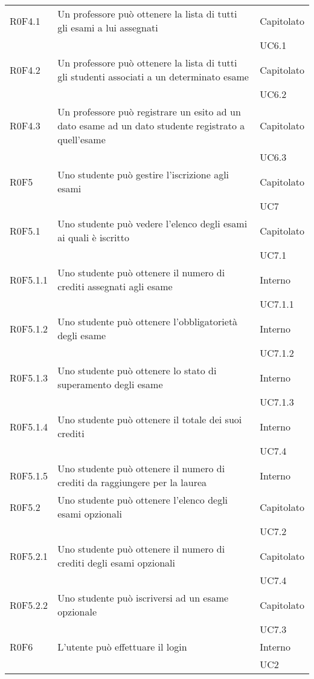 \documentclass[AnalisiDeiRequisiti.tex]{subfiles}
\begin{document}
\begin{longtable}[H]{|p{2cm}|p{5cm}|p{5cm}|}
	R0F4.1 &  Un professore può ottenere la lista di tutti gli esami a lui assegnati & Capitolato \\ 
	& & UC6.1 \\ \hline
	R0F4.2 &  Un professore può ottenere la lista di tutti gli studenti associati a un determinato esame & Capitolato  \\ 
	& & UC6.2 \\ \hline
	R0F4.3 &  Un professore può registrare un esito ad un dato esame ad un dato studente registrato a quell'esame & Capitolato \\ 
	& & UC6.3 \\ \hline
	R0F5 &  Uno studente può gestire l'iscrizione agli esami & Capitolato \\ 
	& & UC7 \\ \hline
	R0F5.1 &  Uno studente può vedere l'elenco degli esami ai quali è iscritto & Capitolato \\ 
	& & UC7.1 \\ \hline
	R0F5.1.1 &  Uno studente può ottenere il numero di crediti assegnati agli esame & Interno \\ 
	& & UC7.1.1 \\ \hline
	R0F5.1.2 &  Uno studente può ottenere l'obbligatorietà degli esame & Interno \\ 
	& & UC7.1.2 \\ \hline
	R0F5.1.3 &  Uno studente può ottenere lo stato di superamento degli esame & Interno \\ 
	& & UC7.1.3 \\ \hline
	R0F5.1.4 &  Uno studente può ottenere il totale dei suoi crediti & Interno \\ 
	& & UC7.4 \\ \hline
	R0F5.1.5 &  Uno studente può ottenere il numero di crediti da raggiungere per la laurea & Interno \\ \hline
	R0F5.2 &  Uno studente può ottenere l'elenco degli esami opzionali & Capitolato \\ 
	& & UC7.2 \\ \hline
	R0F5.2.1 &  Uno studente può ottenere il numero di crediti degli esami opzionali & Capitolato \\ 
	& & UC7.4 \\ \hline
	R0F5.2.2 &  Uno studente può iscriversi ad un esame opzionale & Capitolato \\ 
	& & UC7.3 \\ \hline
	R0F6 &  L'utente può effettuare il login & Interno \\ 
	& & UC2 \\ \hline

\end{longtable}
\end{document}
